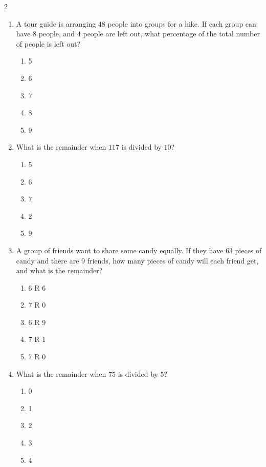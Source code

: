 \documentclass[10pt]{article}
\begin{document}
\begin{multicols}{2}
\begin{enumerate}[label=\textbf{Q\arabic*.}, leftmargin=*, itemsep=6pt, parsep=0pt]
  \item \small A tour guide is arranging $48$ people into groups for a hike. If each group can have $8$ people, and $4$ people are left out, what percentage of the total number of people is left out?
  \begin{enumerate}[label=(\Alph*), leftmargin=0.6cm, nosep, itemsep=2pt]
    \item 5%
    \item 6%
    \item 7%
    \item 8%
    \item 9%
  \end{enumerate}

  \item \small What is the remainder when $117$ is divided by $10$?
  \begin{enumerate}[label=(\Alph*), leftmargin=0.6cm, nosep, itemsep=2pt]
    \item 5
    \item 6
    \item 7
    \item 2
    \item 9
  \end{enumerate}

  \item \small A group of friends want to share some candy equally. If they have $63$ pieces of candy and there are $9$ friends, how many pieces of candy will each friend get, and what is the remainder?
  \begin{enumerate}[label=(\Alph*), leftmargin=0.6cm, nosep, itemsep=2pt]
    \item 6 R 6
    \item 7 R 0
    \item 6 R 9
    \item 7 R 1
    \item 7 R 0
  \end{enumerate}

  \item \small What is the remainder when $75$ is divided by $5$?
  \begin{enumerate}[label=(\Alph*), leftmargin=0.6cm, nosep, itemsep=2pt]
    \item 0
    \item 1
    \item 2
    \item 3
    \item 4
  \end{enumerate}


\end{enumerate}
\end{multicols}
\end{document}
